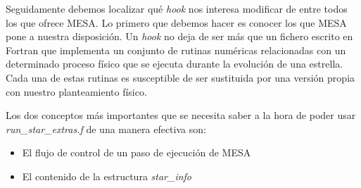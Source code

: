 Seguidamente debemos localizar qué \textit{hook} nos interesa modificar de entre todos los que ofrece MESA. Lo primero que debemos hacer es conocer los que MESA pone a nuestra disposición. Un \textit{hook} no deja de ser más que un fichero escrito en Fortran que implementa un conjunto de rutinas numéricas relacionadas con un determinado proceso físico que se ejecuta durante la evolución de una estrella. Cada una de estas rutinas es susceptible de ser sustituida por una versión propia con nuestro planteamiento físico.\par

Los dos conceptos más importantes que se necesita saber a la hora de poder usar \textit{run\_star\_extras.f} de una manera efectiva son:
\begin{itemize}
    \item El flujo de control de un paso de ejecución de MESA
    \item El contenido de la estructura \textit{star\_info}
\end{itemize}


